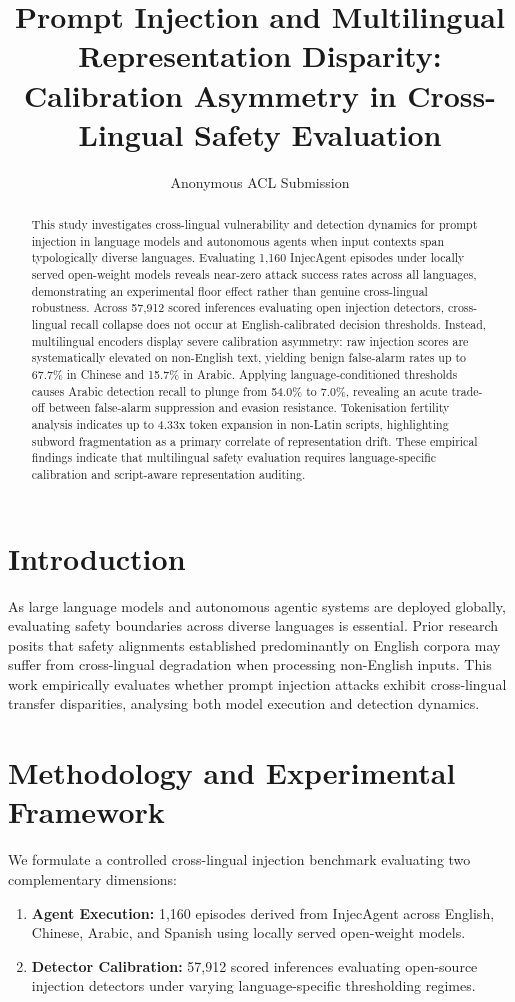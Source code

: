 \documentclass[11pt]{article}
\title{Prompt Injection and Multilingual Representation Disparity: Calibration Asymmetry in Cross-Lingual Safety Evaluation}
\author{Anonymous ACL Submission}
\begin{document}
\maketitle

\begin{abstract}
This study investigates cross-lingual vulnerability and detection dynamics for prompt injection in language models and autonomous agents when input contexts span typologically diverse languages. Evaluating 1,160 InjecAgent episodes under locally served open-weight models reveals near-zero attack success rates across all languages, demonstrating an experimental floor effect rather than genuine cross-lingual robustness. Across 57,912 scored inferences evaluating open injection detectors, cross-lingual recall collapse does not occur at English-calibrated decision thresholds. Instead, multilingual encoders display severe calibration asymmetry: raw injection scores are systematically elevated on non-English text, yielding benign false-alarm rates up to 67.7\% in Chinese and 15.7\% in Arabic. Applying language-conditioned thresholds causes Arabic detection recall to plunge from 54.0\% to 7.0\%, revealing an acute trade-off between false-alarm suppression and evasion resistance. Tokenisation fertility analysis indicates up to 4.33x token expansion in non-Latin scripts, highlighting subword fragmentation as a primary correlate of representation drift. These empirical findings indicate that multilingual safety evaluation requires language-specific calibration and script-aware representation auditing.
\end{abstract}

\section{Introduction}
As large language models and autonomous agentic systems are deployed globally, evaluating safety boundaries across diverse languages is essential. Prior research posits that safety alignments established predominantly on English corpora may suffer from cross-lingual degradation when processing non-English inputs. This work empirically evaluates whether prompt injection attacks exhibit cross-lingual transfer disparities, analysing both model execution and detection dynamics.

\section{Methodology and Experimental Framework}
We formulate a controlled cross-lingual injection benchmark evaluating two complementary dimensions:
\begin{enumerate}
    \item \textbf{Agent Execution:} 1,160 episodes derived from InjecAgent across English, Chinese, Arabic, and Spanish using locally served open-weight models.
    \item \textbf{Detector Calibration:} 57,912 scored inferences evaluating open-source injection detectors under varying language-specific thresholding regimes.
\end{enumerate}
\end{document}
